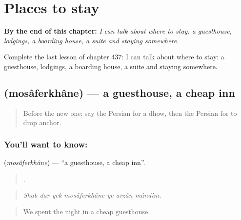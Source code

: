 
\chapter{Places to stay}
\label{ch:fa-places-to-stay}

\begin{chapteropening}
\textbf{By the end of this chapter:} \emph{I can talk about where to stay: a guesthouse, lodgings, a boarding house, a suite and staying somewhere.}

Complete the last lesson of chapter 437: I can talk about where to stay: a guesthouse, lodgings, a boarding house, a suite and staying somewhere.
\end{chapteropening}

\section[\texorpdfstring{\fa{مسافرخانه} (mosâferkhâne)}{مسافرخانه (mosâferkhâne)}]{ (mosâferkhâne) — a guesthouse, a cheap inn}

\label{lesson:FA-C437-mosaferkhane}



\begin{quote}
Before the new one: say the Persian for a dhow, then the Persian for to drop anchor.
\end{quote}

\subsection*{You'll want to know: }
\textbf{} (\emph{mosâferkhâne}) — \textquotedblleft{}a guesthouse, a cheap inn\textquotedblright{}.

\begin{quote}
     .
\end{quote}

\begin{quote}
\emph{Shab dar yek mosâferkhâne-ye arzân mândim.}
\end{quote}

\begin{quote}
We spent the night in a cheap guesthouse.
\end{quote}

